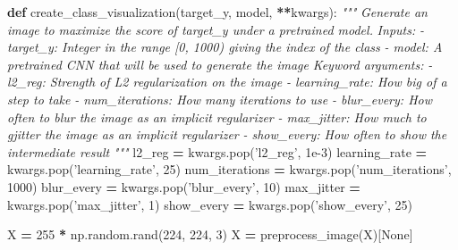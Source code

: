 \documentclass[]{book}
\newenvironment{Shaded}{\begin{snugshade}}{\end{snugshade}}
\newcommand{\KeywordTok}[1]{\textcolor[rgb]{0.13,0.29,0.53}{\textbf{#1}}}
\newcommand{\DecValTok}[1]{\textcolor[rgb]{0.00,0.00,0.81}{#1}}
\newcommand{\FloatTok}[1]{\textcolor[rgb]{0.00,0.00,0.81}{#1}}
\newcommand{\StringTok}[1]{\textcolor[rgb]{0.31,0.60,0.02}{#1}}
\newcommand{\CommentTok}[1]{\textcolor[rgb]{0.56,0.35,0.01}{\textit{#1}}}
\newcommand{\VariableTok}[1]{\textcolor[rgb]{0.00,0.00,0.00}{#1}}
\newcommand{\OperatorTok}[1]{\textcolor[rgb]{0.81,0.36,0.00}{\textbf{#1}}}
\newcommand{\NormalTok}[1]{#1}
\theoremstyle{definition}
\theoremstyle{definition}
\theoremstyle{definition}
\theoremstyle{remark}
\begin{document}
\begin{Shaded}
\begin{Highlighting}[]
\KeywordTok{def}\NormalTok{ create_class_visualization(target_y, model, }\OperatorTok{**}\NormalTok{kwargs):}
    \CommentTok{"""}
\CommentTok{    Generate an image to maximize the score of target_y under a pretrained model.}
\CommentTok{    }
\CommentTok{    Inputs:}
\CommentTok{    - target_y: Integer in the range [0, 1000) giving the index of the class}
\CommentTok{    - model: A pretrained CNN that will be used to generate the image}
\CommentTok{    }
\CommentTok{    Keyword arguments:}
\CommentTok{    - l2_reg: Strength of L2 regularization on the image}
\CommentTok{    - learning_rate: How big of a step to take}
\CommentTok{    - num_iterations: How many iterations to use}
\CommentTok{    - blur_every: How often to blur the image as an implicit regularizer}
\CommentTok{    - max_jitter: How much to gjitter the image as an implicit regularizer}
\CommentTok{    - show_every: How often to show the intermediate result}
\CommentTok{    """}
\NormalTok{    l2_reg }\OperatorTok{=}\NormalTok{ kwargs.pop(}\StringTok{'l2_reg'}\NormalTok{, }\FloatTok{1e-3}\NormalTok{)}
\NormalTok{    learning_rate }\OperatorTok{=}\NormalTok{ kwargs.pop(}\StringTok{'learning_rate'}\NormalTok{, }\DecValTok{25}\NormalTok{)}
\NormalTok{    num_iterations }\OperatorTok{=}\NormalTok{ kwargs.pop(}\StringTok{'num_iterations'}\NormalTok{, }\DecValTok{1000}\NormalTok{)}
\NormalTok{    blur_every }\OperatorTok{=}\NormalTok{ kwargs.pop(}\StringTok{'blur_every'}\NormalTok{, }\DecValTok{10}\NormalTok{)}
\NormalTok{    max_jitter }\OperatorTok{=}\NormalTok{ kwargs.pop(}\StringTok{'max_jitter'}\NormalTok{, }\DecValTok{1}\NormalTok{)}
\NormalTok{    show_every }\OperatorTok{=}\NormalTok{ kwargs.pop(}\StringTok{'show_every'}\NormalTok{, }\DecValTok{25}\NormalTok{)}

\NormalTok{    X }\OperatorTok{=} \DecValTok{255} \OperatorTok{*}\NormalTok{ np.random.rand(}\DecValTok{224}\NormalTok{, }\DecValTok{224}\NormalTok{, }\DecValTok{3}\NormalTok{)}
\NormalTok{    X }\OperatorTok{=}\NormalTok{ preprocess_image(X)[}\VariableTok{None}\NormalTok{]}
    

\end{Highlighting}
\end{Shaded}
\end{document}

